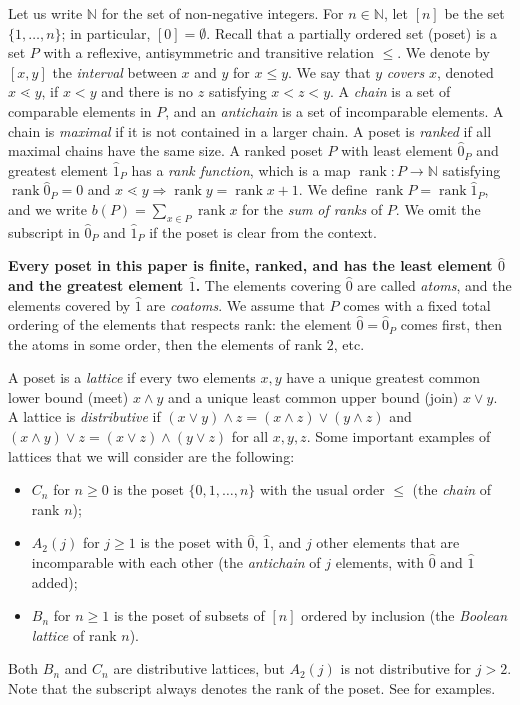 \documentclass[12pt]{amsart}
\newcommand{\N}{{\mathbb N}}
\numberwithin{equation}{section}
\theoremstyle{definition}
\newcommand{\rank}{\operatorname{rank}}
\begin{document}
Let us write $\N$ for the set of non-negative integers. For $n \in
\N$, let $[n]$ be the set $\{1,\ldots,n\}$; in particular, $[0]=\emptyset$. Recall that a partially
ordered set (poset) is a set $P$ with a reflexive, antisymmetric and
transitive relation $\leq$. We denote by $[x,y]$ the \emph{interval}
between $x$ and $y$ for $x \leq y$. We say that $y$ \emph{covers} $x$,
denoted $x \lessdot y$, if $x < y$ and there is no $z$ satisfying $x <
z < y$. A \emph{chain} is a set of comparable elements in $P$, and an
\emph{antichain} is a set of incomparable elements. A chain is
\emph{maximal} if it is not contained in a larger chain. A poset is
\emph{ranked} if all maximal chains have the same size.   A ranked poset $P$
with least element $\hat 0_P$ and greatest element $\hat 1_P$ has a
\emph{rank function}, which is a map $\rank \colon P \to \N$ satisfying $\rank
\hat 0_P = 0$ and $x \lessdot y \Rightarrow \rank y = \rank x + 1$. We
define $\rank P = \rank \hat 1_P$, and we write
$b(P) = \sum_{x \in P} \rank x$ for the \textit{sum of ranks} of $P$.
We omit the subscript in $\hat 0_P$ and $\hat 1_P$ if the poset is clear from the context.



\textbf{Every poset in this paper is finite, ranked, and has the least
element $\hat 0$ and the greatest element $\hat 1$.}  The elements
covering $\hat 0$ are called \emph{atoms}, and the elements covered by
$\hat 1$ are \emph{coatoms}.  We assume that $P$ comes
with a fixed total ordering of the elements that respects rank: the element
$\hat 0=\hat 0_P$ comes first, then the atoms in some order, then the
elements of rank $2$, etc.


A poset is a \emph{lattice} if every two elements $x,y$ have a unique
greatest common lower bound (meet) $x \wedge y$ and a unique least common upper
bound (join) $x \vee y$. A lattice is \emph{distributive} if $(x \vee y)
\wedge z = (x \wedge z) \vee (y \wedge z)$ and $(x \wedge y) \vee z =
(x \vee z) \wedge (y \vee z)$ for all $x,y,z$. Some important examples
of  lattices that we will consider are the following:
\begin{itemize}
  \item $C_n$ for $n \geq 0$ is the poset $\{0,1,\ldots,n\}$ with the
  usual order $\leq$ (the \emph{chain} of rank $n$);
 \item $A_2(j)$ for $j \geq 1$ is the poset with $\hat 0$, $\hat 1$, and $j$ other elements that are incomparable with each other (the \emph{antichain} of $j$ elements, with $\hat 0$ and $\hat 1$ added);
 \item $B_n$ for $n \geq 1$ is the poset of subsets of $[n]$ ordered
 by inclusion (the \emph{Boolean lattice} of rank $n$).
\end{itemize}
Both $B_{n}$ and $C_{n}$ are distributive lattices, but $A_{2}(j)$ is
not distributive for $j>2$.  Note that the subscript always denotes
the rank of the poset. See  for examples.
\end{document}
